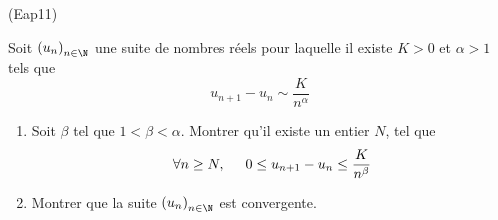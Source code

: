 \begin{tiny}(Eap11)\end{tiny} Soit $\left(u_n\right) _{n\in \N}$ une suite de nombres réels pour laquelle il existe $K>0$ et $\alpha >1$ tels que
\begin{displaymath}
 u_{n+1}-u_n \sim \frac{K}{n^\alpha} 
\end{displaymath}
\begin{enumerate}
 \item Soit $\beta$ tel que $1<\beta < \alpha$. Montrer qu'il existe un entier $N$, tel que 
\begin{displaymath}
 \forall n\geq N,\hspace{0.5cm} 0 \leq u_{n+1}-u_n \leq \frac{K}{n^\beta} 
\end{displaymath}
\item Montrer que la suite $\left(u_n\right) _{n\in \N}$ est convergente.
\end{enumerate}
